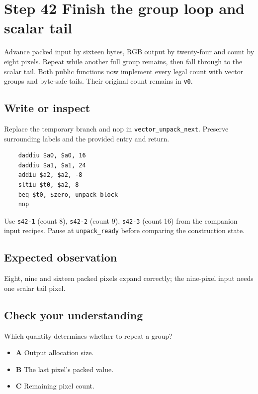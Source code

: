 \section{Step 42 Finish the group loop and scalar tail}\label{rgb-s42}

Advance packed input by sixteen bytes, RGB output by twenty-four and count by eight pixels. Repeat while another full group remains, then fall through to the scalar tail. Both public functions now implement every legal count with vector groups and byte-safe tails. Their original count remains in \texttt{v0}.

\subsection{Write or inspect}
Replace the temporary branch and nop in \texttt{vector\_unpack\_next}. Preserve surrounding labels and the provided entry and return.

\begin{verbatim}
    daddiu $a0, $a0, 16
    daddiu $a1, $a1, 24
    addiu $a2, $a2, -8
    sltiu $t0, $a2, 8
    beq $t0, $zero, unpack_block
    nop
\end{verbatim}
Use \texttt{s42-1} (count 8), \texttt{s42-2} (count 9), \texttt{s42-3} (count 16) from the companion input recipes. Pause at \texttt{unpack\_ready} before comparing the construction state.

\subsection{Expected observation}
Eight, nine and sixteen packed pixels expand correctly; the nine-pixel input needs one scalar tail pixel.

\subsection{Check your understanding}
Which quantity determines whether to repeat a group?

\begin{itemize}
  \item \textbf{A} Output allocation size.
  \item \textbf{B} The last pixel's packed value.
  \item \textbf{C} Remaining pixel count.
\end{itemize}
